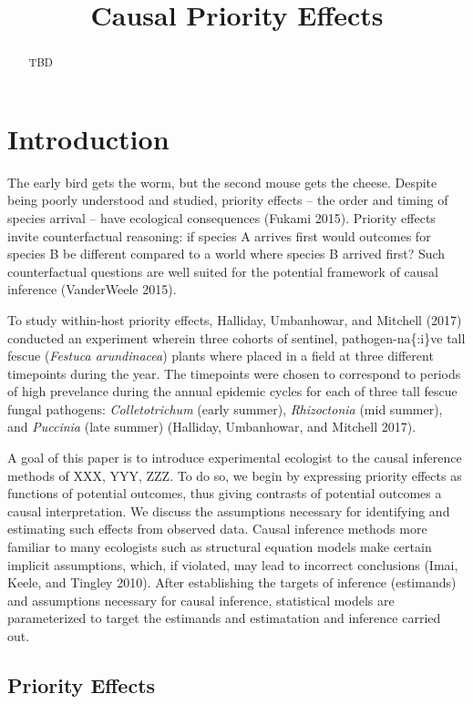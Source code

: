 \documentclass[]{article}
\title{Causal Priority Effects}
\author{}
\date{}
\begin{document}
\maketitle
\begin{abstract}
TBD
\end{abstract}

\hypertarget{introduction}{%
\section{Introduction}\label{introduction}}

The early bird gets the worm, but the second mouse gets the cheese.
Despite being poorly understood and studied, priority effects -- the
order and timing of species arrival -- have ecological consequences
(Fukami 2015). Priority effects invite counterfactual reasoning: if
species A arrives first would outcomes for species B be different
compared to a world where species B arrived first? Such counterfactual
questions are well suited for the potential framework of causal
inference (VanderWeele 2015).

To study within-host priority effects, Halliday, Umbanhowar, and
Mitchell (2017) conducted an experiment wherein three cohorts of
sentinel, pathogen-na\{:i\}ve tall fescue (\emph{Festuca arundinacea})
plants where placed in a field at three different timepoints during the
year. The timepoints were chosen to correspond to periods of high
prevelance during the annual epidemic cycles for each of three tall
fescue fungal pathogens: \emph{Colletotrichum} (early summer),
\emph{Rhizoctonia} (mid summer), and \emph{Puccinia} (late summer)
(Halliday, Umbanhowar, and Mitchell 2017).

A goal of this paper is to introduce experimental ecologist to the
causal inference methods of XXX, YYY, ZZZ. To do so, we begin by
expressing priority effects as functions of potential outcomes, thus
giving contrasts of potential outcomes a causal interpretation. We
discuss the assumptions necessary for identifying and estimating such
effects from observed data. Causal inference methods more familiar to
many ecologists such as structural equation models make certain implicit
assumptions, which, if violated, may lead to incorrect conclusions
(Imai, Keele, and Tingley 2010). After establishing the targets of
inference (estimands) and assumptions necessary for causal inference,
statistical models are parameterized to target the estimands and
estimatation and inference carried out.

\hypertarget{priority-effects}{%
\subsection{Priority Effects}\label{priority-effects}}
\end{document}
